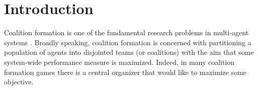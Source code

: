 \documentclass{article}
\begin{document}
\section{Introduction}
Coalition formation is one of the fundamental research problems in multi-agent systems \cite{chalkiadakis2011computational}. 
Broadly speaking, coalition formation is concerned with partitioning a population of agents into disjointed teams (or coalitions) with the aim that some system-wide performance measure is maximized. Indeed, in many coalition formation games there is a central organizer that would like to maximize some objective.
\end{document}
